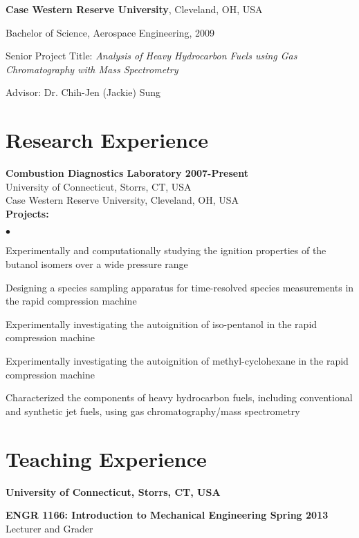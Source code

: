 \documentclass[margin,line]{res}
\newenvironment{list1}{
  \begin{list}{\ding{113}}{%
      \setlength{\itemsep}{0in}
      \setlength{\parsep}{0in} \setlength{\parskip}{0in}
      \setlength{\topsep}{0in} \setlength{\partopsep}{0in} 
      \setlength{\leftmargin}{0.17in}}}{\end{list}}
\newenvironment{list2}{
  \begin{list}{$\bullet$}{%
      \setlength{\itemsep}{0.05in}
      \setlength{\parsep}{0in} \setlength{\parskip}{0in}
      \setlength{\topsep}{0in} \setlength{\partopsep}{0in} 
      \setlength{\leftmargin}{0.2in}}}{\end{list}}
\newenvironment{list3}{
  \begin{list}{\ding{113}}{%
      \setlength{\itemsep}{0.1in}
      \setlength{\parsep}{0in} \setlength{\parskip}{0in}
      \setlength{\topsep}{0in} \setlength{\partopsep}{0in} 
      \setlength{\leftmargin}{0in}}}{\end{list}}
\begin{document}
\begin{resume}
{\bf Case Western Reserve University}, Cleveland, OH, USA
\begin{list1}
\item[] Bachelor of Science, Aerospace Engineering, 2009
\item[] Senior Project Title: \emph{Analysis of Heavy Hydrocarbon Fuels using Gas Chromatography with Mass Spectrometry}
\item[] Advisor: Dr. Chih-Jen (Jackie) Sung
\end{list1}

\section{\sc Research Experience}
{\bf \large{Combustion Diagnostics Laboratory \hfill 2007-Present}}\\
University of Connecticut, Storrs, CT, USA\\
Case Western Reserve University, Cleveland, OH, USA\\
{\bf Projects:}
\begin{list2}
\item Experimentally and computationally studying the ignition properties of the butanol isomers over a wide pressure range
\item Designing a species sampling apparatus for time-resolved species measurements in the rapid compression machine
\item Experimentally investigating the autoignition of iso-pentanol in the rapid compression machine
\item Experimentally investigating the autoignition of methyl-cyclohexane in the rapid compression machine
\item Characterized the components of heavy hydrocarbon fuels, including conventional and synthetic jet fuels, using gas chromatography/mass spectrometry
\end{list2}

\section{\sc Teaching Experience}
{\bf \large{University of Connecticut, Storrs, CT, USA}}\\
\begin{list3}
\item[] {\bf ENGR 1166: Introduction to Mechanical Engineering \hfill Spring 2013}\\
Lecturer and Grader


\end{list3}
\end{resume}
\end{document}
